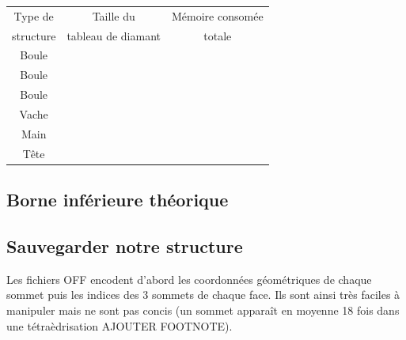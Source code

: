 \documentclass[a4paper,11pt,openany]{article}
\begin{document}
\begin{table}[H]
\footnotesize
\begin{tabular}{|c | c | c |}
\hline
Type de & Taille du & Mémoire consomée \\
structure & tableau de diamant & totale \\
\hline
Boule & & \\
Boule & & \\
Boule & & \\
Vache &  & \\
Main &  & \\
Tête &  & \\
\hline  
\end{tabular}
\label{Tab:results_memory}
\end{table}
\noindent


\subsection{Borne inférieure théorique}

\subsection{Sauvegarder notre structure}
\noindent
Les fichiers OFF encodent d'abord les coordonnées géométriques de chaque sommet puis les indices des 3 sommets de chaque face. Ils sont ainsi très faciles à manipuler mais ne sont pas concis (un sommet apparaît en moyenne 18 fois dans une tétraèdrisation AJOUTER FOOTNOTE).
\end{document}
